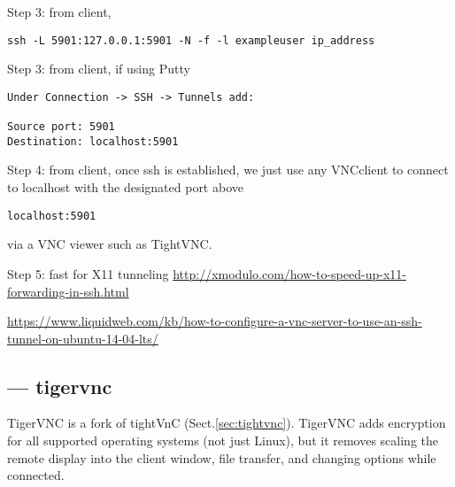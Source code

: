 Step 3: from client, 
\begin{verbatim}
ssh -L 5901:127.0.0.1:5901 -N -f -l exampleuser ip_address
\end{verbatim}

Step 3: from client, if using Putty
\begin{verbatim}
Under Connection -> SSH -> Tunnels add:

Source port: 5901
Destination: localhost:5901
\end{verbatim}

Step 4: from client, once ssh is established, we just use any VNCclient to
connect to localhost with the designated port above
\begin{verbatim}
localhost:5901 
\end{verbatim}
via a VNC viewer such as TightVNC.

Step 5: fast for X11 tunneling
\url{http://xmodulo.com/how-to-speed-up-x11-forwarding-in-ssh.html}


\url{https://www.liquidweb.com/kb/how-to-configure-a-vnc-server-to-use-an-ssh-tunnel-on-ubuntu-14-04-lts/}

\subsection{--- tigervnc}
\label{sec:tigervnc}

TigerVNC is a fork of tightVnC (Sect.\ref{sec:tightvnc}).
TigerVNC adds encryption for all supported operating systems (not just Linux),
but it removes scaling the remote display into the client window, file transfer,
and changing options while connected.


